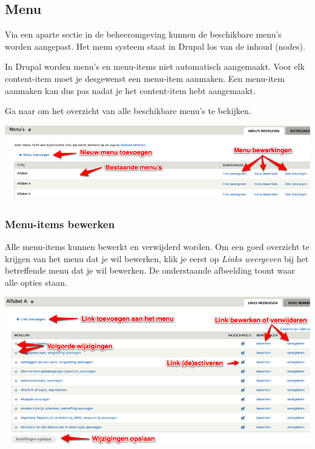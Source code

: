 \subsection{Menu}\label{menu}
Via een aparte sectie in de beheeromgeving kunnen de beschikbare menu's worden aangepast. Het menu systeem staat in Drupal los van de inhoud (nodes). 

In Drupal worden menu's en menu-items niet automatisch aangemaakt. Voor elk content-item moet je desgewenst een menu-item aanmaken. Een menu-item aanmaken kan dus pas nadat je het content-item hebt aangemaakt.

Ga naar  om het overzicht van alle beschikbare menu's te bekijken. 

\bigskip

\begin{center}
	\includegraphics[width=\textwidth]{img/menu1.png}
\end{center}

\subsubsection{Menu-items bewerken}\label{menuitemsbewerken}
Alle menu-items kunnen bewerkt en verwijderd worden. Om een goed overzicht te krijgen van het menu dat je wil bewerken, klik je eerst op \emph{Links weergeven} bij het betreffende menu dat je wil bewerken. De onderstaande afbeelding toont waar alle opties staan.

\bigskip

\begin{center}
	\includegraphics[width=\textwidth]{img/menu2.png}
\end{center}

